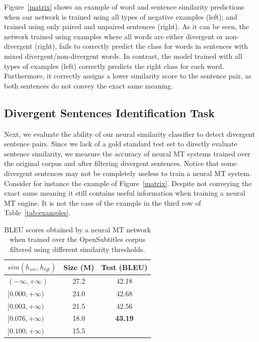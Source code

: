 \documentclass[11pt,a4paper]{article}
\begin{document}
Figure~\ref{matrix} shows an example of word and sentence similarity predictions when our network is trained using all types of negative examples (left); and trained using only paired and unpaired sentences (right). 
As it can be seen, the network trained using examples where all words are either divergent or non-divergent (right), fails to correctly predict the class for words in sentences with mixed divergent/non-divergent words. In contrast, the model trained with all types of examples (left) correctly predicts the right class for each word. Furthermore, it correctly assigns a lower similarity score to the sentence pair, as both sentences do not convey the exact same meaning.

\subsection{Divergent Sentences Identification Task}

Next, we evaluate the ability of our neural similarity classifier to detect divergent sentence pairs. 
Since we lack of a gold standard test set to directly evaluate sentence similarity, 
we measure the accuracy of neural MT systems trained over the original corpus and after filtering divergent sentences. 
Notice that some divergent sentences may not be completely useless to train a neural MT system. 
Consider for instance the example of Figure~\ref{matrix}. 
Despite not conveying the exact same meaning it still contains useful information when training a neural MT engine. 
It is not the case of the example in the third row of Table~\ref{tab:examples}.

\begin{table}[h]
\small
\center
\begin{tabular}{lcc}
\hline
\bf $sim(h_{src},h_{tgt})$ & \bf Size (M) & \bf Test (BLEU)\\%
\hline
$(-\infty,+\infty)$   & 27.2 & 42.18 \\ %
$[0.000,+\infty)$   & 24.0 & 42.68 \\ %
$[0.003,+\infty)$   & 21.5 & 42.56 \\ %
$[0.076,+\infty)$   & 18.0 & \bf 43.19 \\ %
$[0.100,+\infty)$   & 15.5 & \\%
\hline
\end{tabular}
\caption{BLEU scores obtained by a neural MT network when trained over the OpenSubtitles corpus filtered using different similarity thresholds.}
\label{results_wemb}
\end{table}
\end{document}
